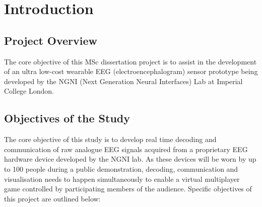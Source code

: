 \chapter{Introduction}

\graphicspath{ {report/Chapter1/assets/} } 

\section{Project Overview}

The core objective of this MSc dissertation project is to assist in the development of an ultra low-cost wearable EEG (electroencephalogram) sensor prototype being developed by the NGNI (Next Generation Neural Interfaces) Lab at Imperial College London.

\section{Objectives of the Study}
The core objective of this study is to develop real time decoding and communication of raw analogue EEG signals acquired from a proprietary EEG hardware device developed by the NGNI lab. As these devices will be worn by up to 100 people during a public demonstration, decoding, communication and visualisation needs to happen simultaneously to enable a virtual multiplayer game controlled by participating members of the audience. Specific objectives of this project are outlined below:

